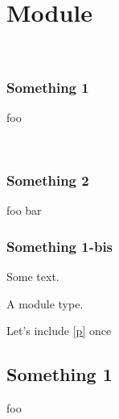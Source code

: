 \section{Module }\label{Include_sections}%
\label{Include_sections-module-type-Something}\begin{ocamlindent}\label{Include_sections-module-type-Something-val-something}\\
\subsubsection{Something 1\label{something-1}}%
foo

\label{Include_sections-module-type-Something-val-foo}\\
\subsubsection{Something 2\label{something-2}}%
\label{Include_sections-module-type-Something-val-bar}\begin{ocamlindent}foo bar\end{ocamlindent}%
\medbreak
\subsubsection{Something 1-bis\label{something-1-bis}}%
Some text.

\end{ocamlindent}%
\begin{ocamlindent}A module type.\end{ocamlindent}%
\medbreak
Let's include \hyperref[Include_sections-module-type-Something]{[p\pageref*{Include_sections-module-type-Something}]} once

 \hyperref[Include_sections-module-type-Something]{}\subsection{Something 1\label{something-1_2}}%
foo

